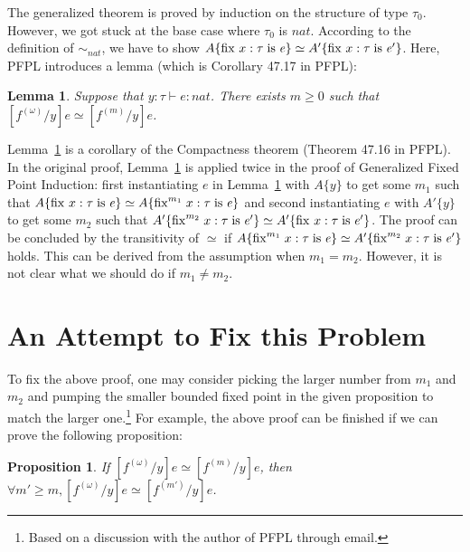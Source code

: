\documentclass{article}
\newtheorem{lemma}{Lemma}
\newtheorem{proposition}{Proposition}
\begin{document}
The generalized theorem is proved by induction on the structure of type $\tau_0$.
However, we got stuck at the base case where $\tau_0$ is $\mathit{nat}$.
According to the definition of $\sim_{\textit{nat}}$,
we have to show $A\{\mathrm{fix}^{}\;x:\tau\;\mathrm{is}\;\mathit{e}\} \simeq A'\{\mathrm{fix}^{}\;x:\tau\;\mathrm{is}\;\mathit{e'}\}$.
Here, PFPL introduces a lemma (which is Corollary 47.17 in PFPL):

\begin{lemma}\label{cor:com}
  Suppose that $y:\tau\vdash e:\textit{nat}$.
  There exists $m\ge 0$ such that $[f^{(\omega)}/y]e \simeq [f^{(m)}/y]e$.
\end{lemma}

Lemma~\ref{cor:com} is a corollary
of the Compactness theorem (Theorem 47.16 in PFPL).
In the original proof, Lemma~\ref{cor:com} is applied twice in the proof of Generalized Fixed Point Induction:
first instantiating $e$ in Lemma~\ref{cor:com} with $A\{y\}$ to get some $m_1$ such that $A\{\mathrm{fix}^{}\;x:\tau\;\mathrm{is}\;\mathit{e}\} \simeq A\{\mathrm{fix}^{m_1}\;x:\tau\;\mathrm{is}\;\mathit{e}\}$
and second instantiating $e$ with $A'\{y\}$ to get some $m_2$ such that $A'\{\mathrm{fix}^{m_2}\;x:\tau\;\mathrm{is}\;\mathit{e'}\} \simeq A'\{\mathrm{fix}^{}\;x:\tau\;\mathrm{is}\;\mathit{e'}\}$.
The proof can be concluded by the transitivity of $\simeq$ if $A\{\mathrm{fix}^{m_1}\;x:\tau\;\mathrm{is}\;\mathit{e}\} \simeq A'\{\mathrm{fix}^{m_2}\;x:\tau\;\mathrm{is}\;\mathit{e'}\}$ holds.
This can be derived from the assumption when $m_1=m_2$.
However, it is not clear what we should do if $m_1 \neq m_2$.

\section{An Attempt to Fix this Problem}
\label{sec:sug}

To fix the above proof, one may consider picking the larger number
from $m_1$ and $m_2$ and pumping the smaller bounded fixed point in
the given proposition to match the larger one.\footnote{Based on a
discussion with the author of PFPL through email.}  For example, the above
proof can be finished if we can prove the following proposition:

\begin{proposition}\label{pro}
  If $[f^{(\omega)}/y]e \simeq [f^{(m)}/y]e$,
  then $\forall m'\ge m, [f^{(\omega)}/y]e \simeq [f^{(m')}/y]e$.
\end{proposition}
\end{document}
